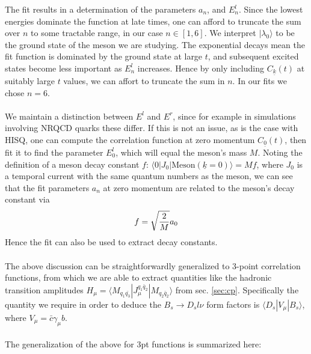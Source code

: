 The fit results in a determination of the parameters $a_n$, and $E^l_n$. Since the lowest energies dominate the function at late times, one can afford to truncate the sum over $n$ to some tractable range, in our case $n\in[1,6]$. We interpret $|\lambda_0\rangle$ to be the ground state of the meson we are studying. The exponential decays mean the fit function is dominated by the ground state at large $t$, and subsequent excited states become less important as $E^l_n$ increases. Hence by only including $C_{\underline{k}}(t)$ at suitably large $t$ values, we can affort to truncate the sum in $n$. In our fits we chose $n=6$.
\\ \\
We maintain a distinction between $E^l$ and $E^r$, since for example in simulations involving NRQCD quarks these differ. If this is not an issue, as is the case with HISQ, one can compute the correlation function at zero momentum $C_{\underline{0}}(t)$, then fit it to find the parameter $E^l_0$, which will equal the meson's mass $M$. Noting the definition of a meson decay constant $f$: $\langle 0 | J_0 | \text{Meson}(\underline{k}=0) \rangle = M f$, where $J_0$ is a temporal current with the same quantum numbers as the meson, we can see that the fit parameters $a_n$ at zero momentum are related to the meson's decay constant via
\begin{align}
	f = \sqrt{2\over M} a_0
\end{align}
Hence the fit can also be used to extract decay constants.
\\ \\
The above discussion can be straightforwardly generalized to 3-point correlation functions, from which we are able to extract quantities like the hadronic transition amplitudes $H_{\mu} = \langle M_{q_1\bar{q_3}} | J_{\mu}^{q_1\bar{q}_2} | M_{q_2\bar{q}_2} \rangle$ from sec. \ref{sec:cp}. Specifically the quantity we require in order to deduce the $B_{s}\to D_{s} l\nu$ form factors is $\langle D_{s} | V_{\mu} | B_{s} \rangle$, where $V_{\mu}=\bar{c}\gamma_{\mu} b$. 
\\ \\
The generalization of the above for 3pt functions is summarized here:
